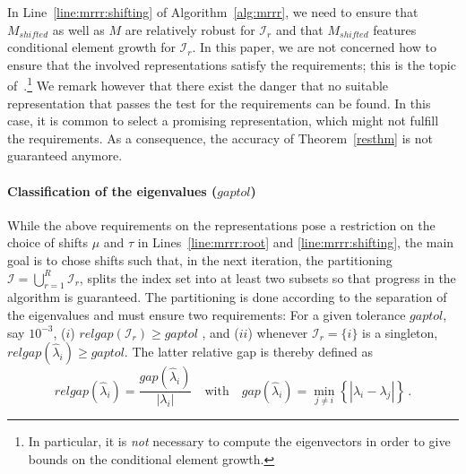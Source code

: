 \documentclass[final]{siamltex}
\begin{document}
In Line~\ref{line:mrrr:shifting} of Algorithm~\ref{alg:mrrr}, we need to
ensure that $M_{shifted}$ as well as $M$ are relatively robust for
$\mathcal{I}_{r}$ and that $M_{shifted}$ features conditional element growth
for $\mathcal{I}_r$. 
In this paper, we are not concerned how to ensure that the involved representations satisfy
the requirements; this is the topic
of~\cite{perturbLDL,Parlett2000121,Dhillon:2004:Ortvecs,Willems:framework}.\footnote{In
  particular, it is {\it not} necessary to compute the eigenvectors in order
  to give bounds on the conditional element growth.} 
We 
remark however that there exist the danger that no suitable representation
that passes the test for the requirements can be found. In this case,
it is common to select a promising representation, which might not fulfill the
requirements. As a consequence, the accuracy of Theorem~\ref{resthm} is not
guaranteed anymore.    

\paragraph{Classification of the eigenvalues ($gaptol$)} 

While the above requirements on the representations pose a restriction on the
choice of shifts $\mu$ and $\tau$ in
Lines~\ref{line:mrrr:root} and \ref{line:mrrr:shifting}, the main goal is to
chose shifts such that, in the next iteration, the partitioning $\mathcal{I} = \bigcup_{r=1}^R
\mathcal{I}_r$, splits the index set into at least two subsets so that progress
in the algorithm is guaranteed. 
The partitioning is done according to the 
separation of the eigenvalues and must ensure two requirements: For a given
tolerance $gaptol$, say $10^{-3}$, ($i$) $relgap(\mathcal{I}_r) \geq gaptol$ , and ($ii$)
whenever $\mathcal{I}_r = \{i\}$ is a singleton, $relgap(\hat{\lambda}_i) \geq 
gaptol$. The latter relative gap is thereby defined as 
\begin{equation*}
relgap(\hat{\lambda}_i) = \frac{gap(\hat{\lambda}_i)}{|\lambda_i|} \quad
\mbox{with} \quad gap(\hat{\lambda}_i) = \min_{j \neq i} \left\{
  |\hat{\lambda}_i - \lambda_j| \right\} \,.
\end{equation*} 
\end{document}
